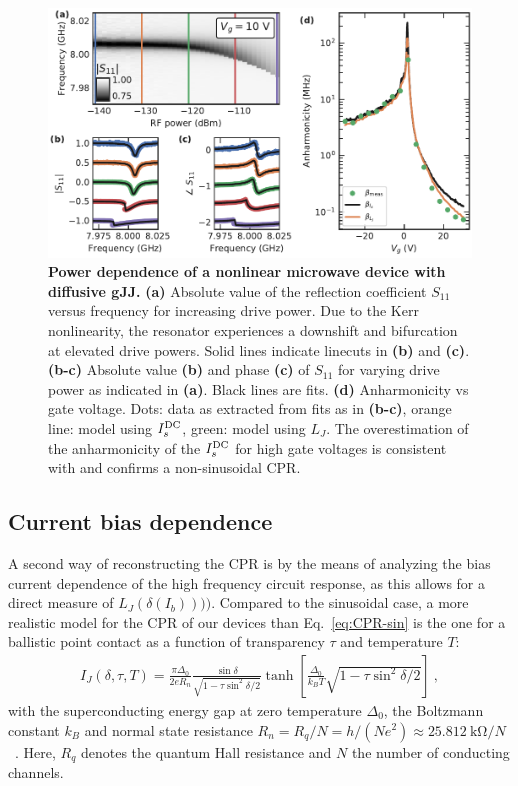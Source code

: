 \begin{figure}[t]
	\centering
	\includegraphics[width=\linewidth]{chapter-gJJ-CPR/figs/Figure4}
	\caption{
		\textbf{Power dependence of a nonlinear microwave device with diffusive gJJ.}
		\textbf{(a)} Absolute value of the reflection coefficient $S_{11}$ versus frequency for increasing drive power.
		Due to the Kerr nonlinearity, the resonator experiences a downshift and bifurcation at elevated drive powers.
		Solid lines indicate linecuts in \textbf{(b)} and \textbf{(c)}.
		\textbf{(b-c)} Absolute value \textbf{(b)} and phase \textbf{(c)} of $S_{11}$ for varying drive power as indicated in \textbf{(a)}.
		Black lines are fits.
		\textbf{(d)} Anharmonicity vs gate voltage.
		Dots: data as extracted from fits as in \textbf{(b-c)}, orange line: model using $I_s^{\rm DC}$, green: model using $L_J$.
		The overestimation of the anharmonicity of the $I_s^{\rm DC}$ for high gate voltages is consistent with and confirms a non-sinusoidal CPR.
	}
	\label{fig:figure4}
\end{figure}

\subsection{Current bias dependence}

A second way of reconstructing the CPR is by the means of analyzing the bias current dependence of the high frequency circuit response, as this allows for a direct measure of $L_J(\delta(I_b))))$.
%
Compared to the sinusoidal case, a more realistic model for the CPR of our devices than Eq.~\ref{eq:CPR-sin} is the one for a ballistic point contact as a function of transparency $\tau$ and temperature $T$:
%
\begin{align}
I_J(\delta,\tau,T) = \frac{\pi\Delta_0}{2 e R_n} \frac{\sin\delta}{\sqrt{1 - \tau \sin^2\delta / 2}} \tanh\left[\frac{\Delta_0}{k_B T} \sqrt{1 - \tau \sin^2\delta / 2}\right]\ ,
\label{eq:CPR-ball}
\end{align}
%
with the superconducting energy gap at zero temperature $\Delta_0$, the Boltzmann constant $k_B$ and normal state resistance $R_n= R_q/N = h/(Ne^2)\approx \SI{25.812}{\kilo\ohm} / N$~\cite{golubovCurrentphaseRelationJosephson2004a,leeUltimatelyShortBallistic2015}.
%
Here, $R_q$ denotes the quantum Hall resistance and $N$ the number of conducting channels.


